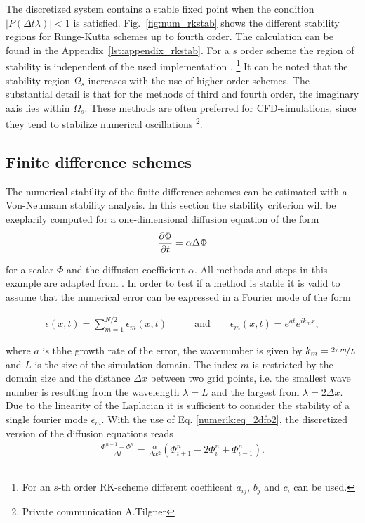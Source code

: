 The discretized system contains a stable fixed point when the condition $|P(\Delta t \lambda)| < 1$ is satisfied.
Fig.~\ref{fig:num_rkstab} shows the different stability regions for Runge-Kutta schemes up to fourth order.
The calculation can be found in the Appendix~\ref{lst:appendix_rkstab}.
For a $s$ order scheme the region of stability is independent of the used implementation \citep{canuto2007}.
\footnote{For an $s$-th order RK-scheme different coeffiicent $a_{ij}$, $b_j$ and $c_i$ can be used.}
It can be noted that the stability region $\Omega_s$ increases with the use of higher order schemes.
The substantial detail is that for the  methods of third and fourth order, the imaginary axis lies within $\Omega_s$.
These methods are often preferred for  CFD-simulations, since they tend to stabilize numerical oscillations \footnote{Private communication A.Tilgner}.

\subsection{Finite difference schemes}

The numerical stability of the finite difference schemes can be estimated with a Von-Neumann stability analysis.
In this section the stability criterion will be exeplarily computed for a one-dimensional diffusion equation of the form
\begin{align}
    \label{num:vne_diffusion_theo}
    \pdn[\Phi]{t} = \alpha \Delta \Phi
\end{align}

for a scalar $\Phi$ and  the diffusion coefficient $\alpha$.
All methods and steps in this example are adapted from \citep{janderson}.
In order to test if a method is stable it is valid to assume that the numerical error can be expressed in a Fourier mode of the form

\begin{align}
    \epsilon(x, t) = \sum_{m=1}^{N/2} \epsilon_m(x, t) \qquad &\text{and} \qquad  \epsilon_m(x, t) = e^{at}e^{i k_m x},
\end{align}

where $a$  is thhe growth rate of the error, the wavenumber is given by $k_m=\nicefrac{2\pi m}{L}$ and $L$ is the size of the simulation domain.
The index $m$ is restricted by the domain size and the distance $\Delta x$ between two grid points, i.e. the smallest wave number
is resulting from the wavelength $\lambda=L$ and the largest from $\lambda=2\Delta x$.
Due to the linearity of the Laplacian it is sufficient to consider the stability of a single fourier mode $\epsilon_m$.
With the use of Eq.  \ref{numerik:eq_2dfo2}, the discretized version of the diffusion equations reads
\begin{align}
    \label{num:neumann_diffusion_eq}
    \frac{\Phi^{n+1} - \Phi^n}{\Delta t} = \frac{\alpha}{\Delta x^2}\left(\Phi_{i+1}^n - 2\Phi_{i}^n + \Phi_{i-1}^n\right).
\end{align}

